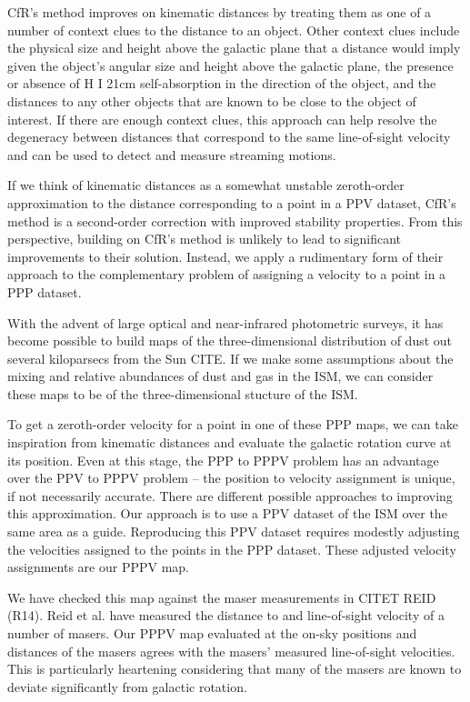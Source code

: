 CfR's method improves on kinematic distances by treating them as one of a number of context clues to the distance to an object.
Other context clues include the physical size and height above the galactic plane that a distance would imply given the object's angular size and height above the galactic plane, the presence or absence of H I 21cm self-absorption in the direction of the object, and the distances to any other objects that are known to be close to the object of interest.
If there are enough context clues, this approach can help resolve the degeneracy between distances that correspond to the same line-of-sight velocity and can be used to detect and measure streaming motions.

If we think of kinematic distances as a somewhat unstable zeroth-order approximation to the distance corresponding to a point in a PPV dataset, CfR's method is a second-order correction with improved stability properties.
From this perspective, building on CfR's method is unlikely to lead to  significant improvements to their solution.
Instead, we apply a rudimentary form of their approach to the complementary problem of assigning a velocity to a point in a PPP dataset.

With the advent of large optical and near-infrared photometric surveys, it has become possible to build maps of the three-dimensional distribution of dust out several kiloparsecs from the Sun CITE.
If we make some assumptions about the mixing and relative abundances of dust and gas in the ISM, we can consider these maps to be of the three-dimensional stucture of the ISM. 

To get a zeroth-order velocity for a point in one of these PPP maps, we can take inspiration from kinematic distances and evaluate the galactic rotation curve at its position. 
Even at this stage, the PPP to PPPV problem has an advantage over the PPV to PPPV problem -- the position to velocity assignment is unique, if not necessarily accurate.
There are different possible approaches to improving this approximation.
Our approach is to use a PPV dataset of the ISM over the same area as a guide.
Reproducing this PPV dataset requires modestly adjusting the velocities assigned to the points in the PPP dataset.
These adjusted velocity assignments are our PPPV map.

We have checked this map against the maser measurements in CITET REID (R14). 
Reid et al. have measured the distance to and line-of-sight velocity of a number of masers.
Our PPPV map evaluated at the on-sky positions and distances of the masers agrees with the masers' measured line-of-sight velocities.
This is particularly heartening considering that many of the masers are known to deviate significantly from galactic rotation.

